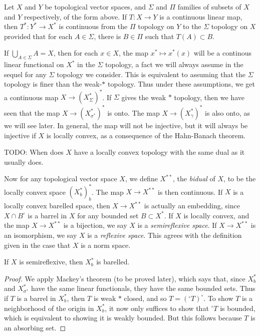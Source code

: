 \begin{theorem}
    Let $X$ and $Y$ be topological vector spaces, and $\Sigma$ and $\Pi$ families of subsets of $X$ and $Y$ respectively, of the form above. If $T: X \to Y$ is a continuous linear map, then $T^*: Y^* \to X^*$ is continuous from the $\Pi$ topology on $Y$ to the $\Sigma$ topology on $X$ provided that for each $A \in \Sigma$, there is $B \in \Pi$ such that $T(A) \subset B$.
\end{theorem}

If $\bigcup_{A \in \Sigma} A = X$, then for each $x \in X$, the map $x^* \mapsto x^*(x)$ will be a continous linear functional on $X^*$ in the $\Sigma$ topology, a fact we will always assume in the sequel for any $\Sigma$ topology we consider. This is equivalent to assuming that the $\Sigma$ topology is finer than the weak-$*$ topology. Thus under these assumptions, we get a continuous map $X \to (X^*_\Sigma)^*$. If $\Sigma$ gives the weak $*$ topology, then we have seen that the map $X \to (X^*_{\sigma^*})^*$ is onto. The map $X \to (X^*_\gamma)^*$ is also onto, as we will see later. In general, the map will not be injective, but it will always be injective if $X$ is locally convex, as a consequence of the Hahn-Banach theorem.

\begin{lemma}
    TODO: When does $X$ have a locally convex topology with the same dual as it usually does.
\end{lemma}

Now for any topological vector space $X$, we define $X^{**}$, the \emph{bidual} of $X$, to be the locally convex space $(X^*_b)^*_b$. The map $X \to X^{**}$ is then continuous. If $X$ is a locally convex barelled space, then $X \to X^{**}$ is actually an embedding, since $X \cap B^\circ$ is a barrel in $X$ for any bounded set $B \subset X^*$. If $X$ is locally convex, and the map $X \to X^{**}$ is a bijection, we say $X$ is a \emph{semireflexive space}. If $X \to X^{**}$ is an isomorphism, we say $X$ is a \emph{reflexive space}. This agrees with the definition given in the case that $X$ is a norm space.

\begin{theorem}
    If $X$ is semireflexive, then $X^*_b$ is barelled.
\end{theorem}
\begin{proof}
    We apply Mackey's theorem (to be proved later), which says that, since $X^*_b$ and $X^*_{\sigma^*}$ have the same linear functionals, they have the same bounded sets. Thus if $T$ is a barrel in $X^*_b$, then $T$ is weak $*$ closed, and so $T = ({}^\circ T)^\circ$. To show $T$ is a neighborhood of the origin in $X^*_b$, it now only suffices to show that ${}^\circ T$ is bounded, which is equivalent to showing it is weakly bounded. But this follows because $T$ is an absorbing set.
\end{proof}

